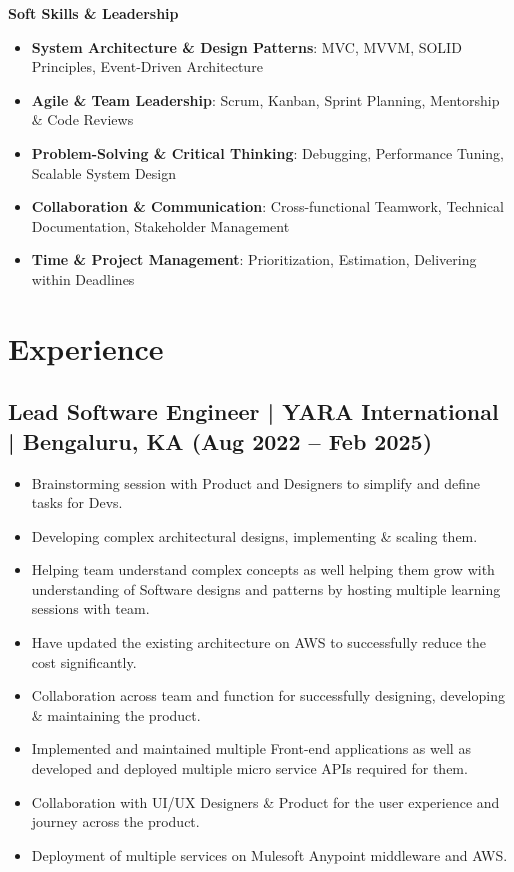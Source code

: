 \documentclass[10pt,a4paper]{article}
\begin{document}
\textbf{Soft Skills \& Leadership}
\begin{itemize}[leftmargin=*]
  \item \textbf{System Architecture \& Design Patterns}: MVC, MVVM, SOLID Principles, Event-Driven Architecture
  \item \textbf{Agile \& Team Leadership}: Scrum, Kanban, Sprint Planning, Mentorship \& Code Reviews
  \item \textbf{Problem-Solving \& Critical Thinking}: Debugging, Performance Tuning, Scalable System Design
  \item \textbf{Collaboration \& Communication}: Cross-functional Teamwork, Technical Documentation, Stakeholder Management
  \item \textbf{Time \& Project Management}: Prioritization, Estimation, Delivering within Deadlines
\end{itemize}

\section*{Experience}

\subsection*{Lead Software Engineer | YARA International | Bengaluru, KA (Aug 2022 -- Feb 2025)}
\begin{itemize}[leftmargin=*]
  \item Brainstorming session with Product and Designers to simplify and define tasks for Devs.
  \item Developing complex architectural designs, implementing \& scaling them.
  \item Helping team understand complex concepts as well helping them grow with understanding of Software designs and patterns by hosting multiple learning sessions with team.
  \item Have updated the existing architecture on AWS to successfully reduce the cost significantly.
  \item Collaboration across team and function for successfully designing, developing \& maintaining the product.
  \item Implemented and maintained multiple Front-end applications as well as developed and deployed multiple micro service APIs required for them.
  \item Collaboration with UI/UX Designers \& Product for the user experience and journey across the product.
  \item Deployment of multiple services on Mulesoft Anypoint middleware and AWS.
\end{itemize}
\end{document}
